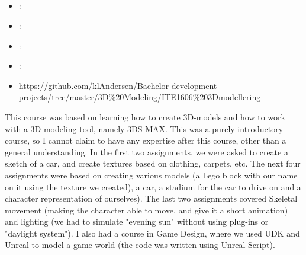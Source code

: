 \subsection[3D Modelling]{}
\label{sec:ite1606_3d_modelling}
\begin{itemize} 
	\item {}: 
	\item {}: 
	\item {}: 
	\item {}: 
	\item {} \url{https://github.com/klAndersen/Bachelor-development-projects/tree/master/3D%20Modeling/ITE1606%203Dmodellering}
\end{itemize} 
This course was based on learning how to create 3D-models and how to work with a 3D-modeling tool, namely 3DS MAX. 
This was a purely introductory course, so I cannot claim to have any expertise after this course, other than a general understanding.
\vspace{0.5em}\newline
In the first two assignments, we were asked to create a sketch of a car, and create textures based on clothing, carpets, etc. 
The next four assignments were based on creating various models (a Lego block with our name on it using the texture we created), a car, 
a stadium for the car to drive on and a character representation of ourselves).
\vspace{0.5em}\newline
The last two assignments covered Skeletal movement (making the character able to move, and give it a short animation) and lighting 
(we had to simulate "evening sun" without using plug-ins or "daylight system").
\vspace{0.5em}\newline
I also had a course in Game Design, where we used UDK and Unreal to model a game world (the code was written using Unreal Script).
